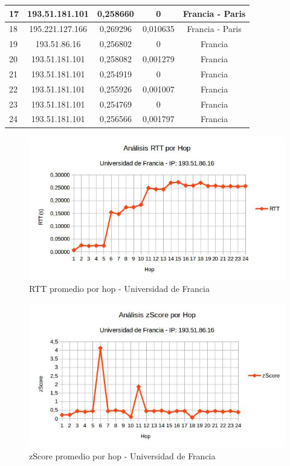 \begin{tabular}{ | l | c | c | c | c |}
  \hline 
   17 & 193.51.181.101 & 0,258660 & 0 & Francia - Paris\\
  \hline 
   18 & 195.221.127.166 & 0,269296 & 0,010635 & Francia - Paris\\
  \hline 
   19 & 193.51.86.16 & 0,256802 & 0 & Francia\\
  \hline 
   20 & 193.51.181.101 & 0,258082 & 0,001279 & Francia\\
  \hline 
   21 & 193.51.181.101 & 0,254919 & 0 & Francia\\
  \hline 
   22 & 193.51.181.101 & 0,255926 & 0,001007 & Francia\\
  \hline 
   23 & 193.51.181.101 & 0,254769 & 0 & Francia\\
  \hline 
   24 & 193.51.181.101 & 0,256566 & 0,001797 & Francia\\    
 \hline 
\end{tabular}

\bigskip

\begin{figure}[H]
\centering
\includegraphics[width=1\textwidth]{graficos/rTT_Francia.jpg}
\caption{RTT promedio por hop - Universidad de Francia}
\label{francia_rtt}
\end{figure}

\begin{figure}[H]
\centering
\includegraphics[width=1\textwidth]{graficos/zScore_Francia.jpg}
\caption{zScore promedio por hop - Universidad de Francia}
\label{francia_zs}
\end{figure}

\newpage


\newpage

